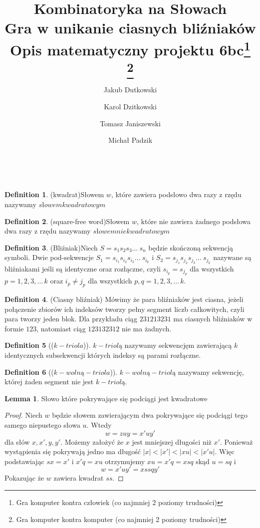\documentclass[11pt,a4paper]{article}
\author{Jakub Dutkowski}
\author{Karol Dzitkowski}
\author{Tomasz Janiszewski}
\author{Michał Padzik}
\affil{Wydział Matematyki i Nauk Informacyjnych, Politechnika Warszawska}
\title{
	Kombinatoryka na Słowach\\
	Gra w unikanie ciasnych bliźniaków\\
	Opis matematyczny projektu
	6bc\footnote{Gra komputer kontra człowiek (co najmniej 2 poziomy trudności)}
\footnote{Gra komputer kontra komputer (co najmniej 2 poziomy trudności)}
 }
\theoremstyle{definition}
\newtheorem{definition}{Definition}[section]
\newtheorem{lemma}{Lemma}[section]
\begin{document}
\maketitle\
\newpage\


\begin{definition}{(kwadrat)}\label{def:sqr-word}
Słowem $w$, które zawiera podsłowo dwa razy z rzędu
nazywamy $słowem kwadratowym$
\end{definition}
\begin{definition}{(square-free word)}\label{def:sqr-free-word}
Słowem $w$, które nie zawiera żadnego podsłowa dwa razy z rzędu
nazywamy $słowem niekwadratowym$
\end{definition}
\begin{definition}{(Bliźniak)}\label{def:blizniak}
Niech $S = s_1 s_2 s_3 \ldots\ s_n$ będzie skończoną sekwencją symboli. Dwie pod-sekwencje
$S_1 = s_{i_1} s_{i_2} s_{i_3} \ldots\ s_{i_k}$ i $S_2 = s_{j_1} s_{j_2} s_{j_3} \ldots\ s_{j_k}$
nazywane są bliźniakami jeśli są identyczne oraz rozłączne, czyli $s_{i_p} = s_{j_p}$ dla 
wszystkich $p = {1, 2, 3, \ldots\, k}$ oraz $ i_p \neq j_p $ dla wszystkich $ p,q = {1, 2, 3, \ldots\, k}$.
\end{definition}
\begin{definition}{(Ciasny bliźniak)}
Mówimy że para bliźniaków jest ciasna, jeżeli połączenie zbiorów ich indeksów tworzy pełny segment
liczb całkowitych, czyli para tworzy jeden blok. Dla przykładu ciąg $231213231$ ma ciasnych bliźniaków
w formie $123$, natomiast ciąg $123132312$ nie ma żadnych.
\end{definition}
\begin{definition}[($k-triola$)]\label{def:triola}
$k-triolą$ nazywamy sekwencjęm zawierającą $k$ identycznych subsekwencji
których indeksy są parami rozłączne.
\end{definition}
\begin{definition}[($k-wolną-triola$)]\label{def:triola}
$k-wolną-triolą$ nazywamy sekwencję, której żaden segment
nie jest $k-triolą$.
\end{definition}


\begin{lemma}\label{lemat:1}
Słowo które pokrywające się podciągi jest kwadratowe
\begin{proof}
Niech $w$ będzie słowem zawierającym dwa pokrywające się podciągi tego
samego niepustego słowa $u$. 
Wtedy $$w = zuy = x'uy'$$ dla słów $x,x',y,y'$. Możemy założyć że $x$
jest mniejszej długości niż $x'$. Ponieważ wystąpienia się pokrywają 
jedno ma długość $|x| < |x'| < |xu| < |x'u|$. Więc podstawiając 
$sx = x'$ i $x'q = xu$ otrzymujemy $xu = x'q = xsq$
skąd $u =  sq$ i $$w = x'uy' = xssqy' $$
Pokazując że $w$ zawiera kwadrat $ss$.
\end{proof}
\end{lemma}
\end{document}
